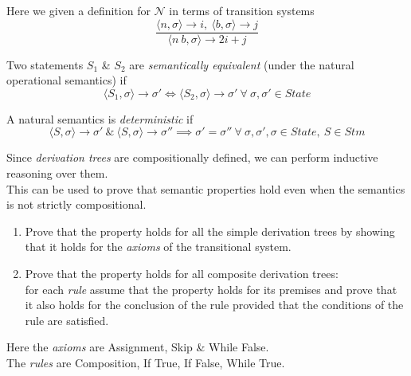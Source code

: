 \documentclass[11pt,a4paper]{article}
\begin{document}
Here we given a definition for $\mathcal{N}$ in terms of transition systems
$$\dfrac{\langle n,\sigma\rangle\to i,\ \langle b,\sigma\rangle\to j}{\langle n\ b,\sigma\rangle\to2i+j}$$

Two statements $S_1$ \& $S_2$ are \textit{semantically equivalent} (under the natural operational semantics) if
$$\langle S_1,\sigma\rangle\to\sigma'\Leftrightarrow\langle S_2,\sigma\rangle\to\sigma'\ \forall\ \sigma,\sigma'\in State$$

A natural semantics is \textit{deterministic} if
$$\langle S,\sigma\rangle\to\sigma'\ \&\ \langle S,\sigma\rangle\to\sigma''\implies\sigma'=\sigma''\ \forall\ \sigma,\sigma',\sigma\in State,\ S\in Stm$$

Since \textit{derivation trees} are compositionally defined, we can perform inductive reasoning over them.\\
This can be used to prove that semantic properties hold even when the semantics is not strictly compositional.
\begin{enumerate}[label=\roman*)]
	\item Prove that the property holds for all the simple derivation trees by showing that it holds for the \textit{axioms} of the transitional system.
	\item Prove that the property holds for all composite derivation trees:\\
	for each \textit{rule} assume that the property holds for its premises and prove that it also holds for the conclusion of the rule provided that the conditions of the rule are satisfied. 
\end{enumerate}
\nb Here the \textit{axioms} are Assignment, Skip \& While False.\\
The \textit{rules} are Composition, If True, If False, While True.\\
\end{document}
